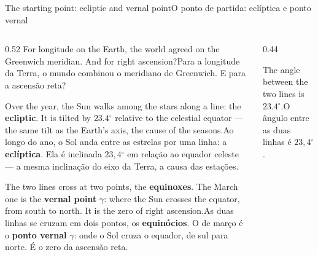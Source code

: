 \documentclass[aspectratio=169,11pt]{beamer}
\newcommand{\tr}[2]{\ifEN#2\else#1\fi}
\newcommand{\bnum}[1]{\textbf{\textcolor{mTeal}{#1}}}
\newcommand{\tmpo}[1]{\textcolor{corTempo}{\textbf{#1}}}
\newcommand{\gr}{\ensuremath{{}^{\circ}}}
\newcommand{\esferaContorno}{\draw[mStoneMid!70, thick, fill=corCeu!5] (0,0) circle (1);}
\newcommand{\esferaEquador}{%
  \draw[corCeu!70, dashed] plot[smooth] coordinates {(0.996,-0.033) (1.000,0.000) (0.996,0.033) (0.985,0.065) (0.966,0.097) (0.940,0.128) (0.906,0.158) (0.866,0.187) (0.819,0.215) (0.766,0.241) (0.707,0.265) (0.643,0.287) (0.574,0.307) (0.500,0.324) (0.423,0.340) (0.342,0.352) (0.259,0.362) (0.174,0.369) (0.087,0.373) (0.000,0.375) (-0.087,0.373) (-0.174,0.369) (-0.259,0.362) (-0.342,0.352) (-0.423,0.340) (-0.500,0.324) (-0.574,0.307) (-0.643,0.287) (-0.707,0.265) (-0.766,0.241) (-0.819,0.215) (-0.866,0.187) (-0.906,0.158) (-0.940,0.128) (-0.966,0.097) (-0.985,0.065) (-0.996,0.033) (-1.000,0.000)};
  \draw[corCeu, very thick] plot[smooth] coordinates {(-0.643,-0.287) (-0.574,-0.307) (-0.500,-0.324) (-0.423,-0.340) (-0.342,-0.352) (-0.259,-0.362) (-0.174,-0.369) (-0.087,-0.373) (0.000,-0.375) (0.087,-0.373) (0.174,-0.369) (0.259,-0.362) (0.342,-0.352) (0.423,-0.340) (0.500,-0.324) (0.574,-0.307) (0.643,-0.287) (0.707,-0.265) (0.766,-0.241) (0.819,-0.215) (0.866,-0.187) (0.906,-0.158) (0.940,-0.128) (0.966,-0.097) (0.985,-0.065) (0.996,-0.033)};
  \draw[corCeu, very thick] plot[smooth] coordinates {(-1.000,0.000) (-0.996,-0.033) (-0.985,-0.065) (-0.966,-0.097) (-0.940,-0.128) (-0.906,-0.158) (-0.866,-0.187) (-0.819,-0.215) (-0.766,-0.241) (-0.707,-0.265) (-0.643,-0.287)};
}
\newcommand{\esferaEcliptica}{%
  \draw[corTempo!70, dashed] plot[smooth] coordinates {(0.952,0.298) (0.951,0.307) (0.944,0.315) (0.930,0.320) (0.908,0.322) (0.880,0.323) (0.844,0.320) (0.803,0.315) (0.755,0.308) (0.702,0.299) (0.643,0.287) (0.579,0.273) (0.511,0.257) (0.439,0.239) (0.364,0.219) (0.286,0.198) (0.205,0.175) (0.123,0.150) (0.041,0.125) (-0.042,0.098) (-0.125,0.071) (-0.207,0.043) (-0.287,0.015) (-0.365,-0.013) (-0.441,-0.041) (-0.513,-0.069) (-0.581,-0.096) (-0.644,-0.122) (-0.703,-0.148) (-0.756,-0.172) (-0.804,-0.195) (-0.845,-0.217) (-0.880,-0.237) (-0.909,-0.255) (-0.930,-0.272) (-0.944,-0.286) (-0.952,-0.298)};
  \draw[corTempo, very thick] plot[smooth] coordinates {(-0.643,-0.287) (-0.579,-0.273) (-0.511,-0.257) (-0.439,-0.239) (-0.364,-0.219) (-0.286,-0.198) (-0.205,-0.175) (-0.123,-0.150) (-0.041,-0.125) (0.042,-0.098) (0.125,-0.071) (0.207,-0.043) (0.287,-0.015) (0.365,0.013) (0.441,0.041) (0.513,0.069) (0.581,0.096) (0.644,0.122) (0.703,0.148) (0.756,0.172) (0.804,0.195) (0.845,0.217) (0.880,0.237) (0.909,0.255) (0.930,0.272) (0.944,0.286) (0.952,0.298)};
  \draw[corTempo, very thick] plot[smooth] coordinates {(-0.952,-0.298) (-0.951,-0.307) (-0.944,-0.315) (-0.930,-0.320) (-0.908,-0.322) (-0.880,-0.323) (-0.844,-0.320) (-0.803,-0.315) (-0.755,-0.308) (-0.702,-0.299) (-0.643,-0.287)};
}
\newcommand{\ptGama}{(-0.643,-0.287)}
\newcommand{\ptSolJun}{(0.703,0.148)}
\newcommand{\ptSol}{(0.207,-0.043)}
\newcommand{\ptEclA}{(-0.483,-0.250)}
\newcommand{\ptEclB}{(-0.140,-0.155)}
\begin{document}
\begin{frame}{\tr{O ponto de partida: eclíptica e ponto vernal}{The starting point: ecliptic and vernal point}}
  \begin{columns}[T]
    \begin{column}{0.52\textwidth}
      \small
      \tr{Para a longitude da Terra, o mundo combinou o meridiano de Greenwich. E para a
      ascensão reta?}{For longitude on the Earth, the world agreed on the Greenwich meridian.
      And for right ascension?}
      \medskip

      \tr{Ao longo do ano, o Sol anda entre as estrelas por uma linha: a \tmpo{eclíptica}. Ela
      é inclinada \bnum{$23{,}4\gr$} em relação ao equador celeste --- a mesma inclinação do
      eixo da Terra, a causa das estações.}{Over the year, the Sun walks among the stars along
      a line: the \tmpo{ecliptic}. It is tilted by \bnum{$23.4\gr$} relative to the celestial
      equator --- the same tilt as the Earth's axis, the cause of the seasons.}
      \medskip

      \tr{As duas linhas se cruzam em dois pontos, os \bnum{equinócios}. O de março é o
      \textbf{ponto vernal} $\gamma$: onde o Sol cruza o equador, de sul para norte. É o
      zero da ascensão reta.}{The two lines cross at two points, the \bnum{equinoxes}. The
      March one is the \textbf{vernal point} $\gamma$: where the Sun crosses the equator,
      from south to north. It is the zero of right ascension.}
    \end{column}
    \begin{column}{0.44\textwidth}
      \centering
      \par
      {\scriptsize\textcolor{mStoneMid}{\tr{O ângulo entre as duas linhas é $23{,}4\gr$.}{The
      angle between the two lines is $23.4\gr$.}}}
    \end{column}
  \end{columns}
\end{frame}
\end{document}
